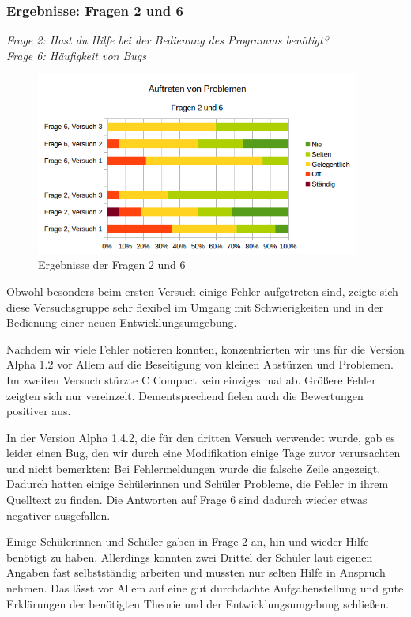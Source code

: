 \subsubsection*{Ergebnisse: Fragen 2 und 6}

\emph{Frage 2: Hast du Hilfe bei der Bedienung des Programms benötigt?\\
Frage 6: Häufigkeit von Bugs}

\begin{figure}[h!]
\centering
\includegraphics[width=0.95\textwidth]{./media/images/gui/trials/gui-f2-6.png}
\caption{Ergebnisse der Fragen 2 und 6}
\end{figure}

Obwohl besonders beim ersten Versuch einige Fehler aufgetreten sind, zeigte sich diese Versuchsgruppe sehr flexibel im Umgang mit Schwierigkeiten und in der Bedienung einer neuen Entwicklungsumgebung.

Nachdem wir viele Fehler notieren konnten, konzentrierten wir uns für die Version Alpha 1.2 vor Allem auf die Beseitigung von kleinen Abstürzen und Problemen. Im zweiten Versuch stürzte C Compact kein einziges mal ab. Größere Fehler zeigten sich nur vereinzelt. Dementsprechend fielen auch die Bewertungen positiver aus.

In der Version Alpha 1.4.2, die für den dritten Versuch verwendet wurde, gab es leider einen Bug, den wir durch eine Modifikation einige Tage zuvor verursachten und nicht bemerkten: Bei Fehlermeldungen wurde die falsche Zeile angezeigt. Dadurch hatten einige Schülerinnen und Schüler Probleme, die Fehler in ihrem Quelltext zu finden. Die Antworten auf Frage 6 sind dadurch wieder etwas negativer ausgefallen.

Einige Schülerinnen und Schüler gaben in Frage 2 an, hin und wieder Hilfe benötigt zu haben. Allerdings konnten zwei Drittel der Schüler laut eigenen Angaben fast selbstständig arbeiten und mussten nur selten Hilfe in Anspruch nehmen. Das lässt vor Allem auf eine gut durchdachte Aufgabenstellung und gute Erklärungen der benötigten Theorie und der Entwicklungsumgebung schließen.

